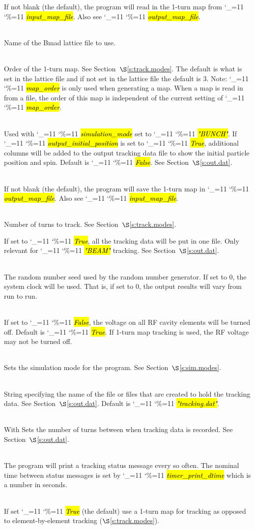 \documentclass{hitec}
\newcommand\dottcmd[1]{\hl{\em#1}\endgroup}
\newcommand{\vn}{\begingroup\catcode`\_=11 \catcode`\%=11 \dottcmd}
\newcommand{\Newline}{\hfil \\}
\newcommand{\sref}[1]{$\S$\ref{#1}}
\begin{document}
{{\begin{description}
If not blank (the default), the program will read in the 1-turn map from \vn{input_map_file}. Also
see \vn{output_map_file}.
%
\item[lat_file] \Newline
Name of the Bmad lattice file to use.
%
\item[map_order] \Newline
Order of the 1-turn map. See Section~\sref{s:track.modes}. The default is what is set in the lattice
file and if not set in the lattice file the default is 3. Note: \vn{map_order} is only used when
generating a map.  When a map is read in from a file, the order of this map is independent of the
current setting of \vn{map_order}.
%
\item[output_initial_position] \Newline
Used with \vn{simulation_mode} set to \vn{"BUNCH"}. If \vn{output_initial_position} is set to
\vn{True}, additional columns will be added to the output tracking data file to show the initial
particle position and spin. Default is \vn{False}. See Section~\sref{s:out.dat}.
%
\item[output_map_file] \Newline
If not blank (the default), the program will save the 1-turn map in \vn{output_map_file}. Also
see \vn{input_map_file}.
%
\item[n_turns] \Newline
Number of turns to track. See Section~\sref{s:track.modes}.
%
\item[one_tracking_data_file]
If set to \vn{True}, all the tracking data will be put in one file. Only relevant for \vn{"BEAM"}
tracking.  See Section~\sref{s:out.dat}.
%
\item[random_seed] \Newline
The random number seed used by the random number generator. If set to 0, the
system clock will be used. That is, if set to 0, the output results will vary from run to run.
%
\item[rfcavity_on] \Newline
If set to \vn{False}, the voltage on all RF cavity elements will be turned off. Default is \vn{True}.
If 1-turn map tracking is used, the RF voltage may not be turned off.
%
\item[simulation_mode] \Newline
Sets the simulation mode for the program. See Section~\sref{s:sim.modes}.
%
\item[tracking_data_file] \Newline
String specifying the name of the file or files that are created to hold the tracking
data. See Section~\sref{s:out.dat}. Default is \vn{"tracking.dat"}.
%
\item[output_every_n_turns] \Newline
With Sets the number of turns between when tracking data is recorded. See Section~\sref{s:out.dat}.
%
\item[timer_print_dtime] \Newline
The program will print a tracking status message every so often. The nominal time between status
messages is set by \vn{timer_print_dtime} which is a number in seconds.
%
\item[use_1_turn_map] \Newline
If set \vn{True} (the default) use a 1-turn map for tracking as opposed to element-by-element
tracking (\sref{s:track.modes}).
\end{description}

}}
\end{document}
